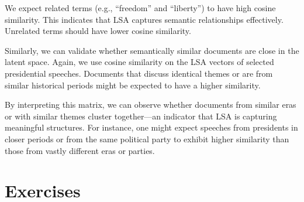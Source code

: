 \documentclass[
]{book}
\newenvironment{Shaded}{\begin{snugshade}}{\end{snugshade}}
\newcommand{\CommentTok}[1]{\textcolor[rgb]{0.56,0.35,0.01}{\textit{#1}}}
\newcommand{\ConstantTok}[1]{\textcolor[rgb]{0.56,0.35,0.01}{#1}}
\newcommand{\FunctionTok}[1]{\textcolor[rgb]{0.13,0.29,0.53}{\textbf{#1}}}
\newcommand{\NormalTok}[1]{#1}
\newcommand{\OtherTok}[1]{\textcolor[rgb]{0.56,0.35,0.01}{#1}}
\newcommand{\SpecialCharTok}[1]{\textcolor[rgb]{0.81,0.36,0.00}{\textbf{#1}}}
\newcommand{\StringTok}[1]{\textcolor[rgb]{0.31,0.60,0.02}{#1}}
\begin{document}
We expect related terms (e.g., ``freedom'' and ``liberty'') to have high cosine similarity. This indicates that LSA captures semantic relationships effectively. Unrelated terms should have lower cosine similarity.

Similarly, we can validate whether semantically similar documents are close in the latent space. Again, we use cosine similarity on the LSA vectors of selected presidential speeches. Documents that discuss identical themes or are from similar historical periods might be expected to have a higher similarity.

\begin{Shaded}
\end{Shaded}

By interpreting this matrix, we can observe whether documents from similar eras or with similar themes cluster together---an indicator that LSA is capturing meaningful structures. For instance, one might expect speeches from presidents in closer periods or from the same political party to exhibit higher similarity than those from vastly different eras or parties.

\section{Exercises}\label{exercises-4}
\end{document}
